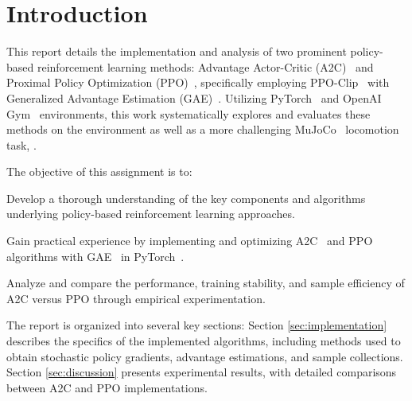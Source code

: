 \section{Introduction}
\label{sec:introduction}

This report details the implementation and analysis of two prominent policy-based reinforcement learning methods: Advantage Actor-Critic (A2C)~\cite{han2020actorcriticreinforcementlearningcontrol} and Proximal Policy Optimization (PPO)~\cite{schulman2017proximal}, specifically employing PPO-Clip~\cite{huang2024ppoclipattainsglobaloptimality} with Generalized Advantage Estimation (GAE)~\cite{schulman2018highdimensionalcontinuouscontrolusing}.
Utilizing PyTorch~\cite{PyTorch2} and OpenAI Gym~\cite{brockman2016openai} environments, this work systematically explores and evaluates these methods on the \pendulum environment as well as a more challenging MuJoCo~\cite{MuJoCo} locomotion task, \walker.

The objective of this assignment is to:

Develop a thorough understanding of the key components and algorithms underlying policy-based reinforcement learning approaches.

Gain practical experience by implementing and optimizing A2C~\cite{han2020actorcriticreinforcementlearningcontrol} and PPO~\cite{schulman2017proximal} algorithms with GAE~\cite{schulman2018highdimensionalcontinuouscontrolusing} in PyTorch~\cite{PyTorch2}.

Analyze and compare the performance, training stability, and sample efficiency of A2C versus PPO through empirical experimentation.

The report is organized into several key sections:
Section \ref{sec:implementation} describes the specifics of the implemented algorithms, including methods used to obtain stochastic policy gradients, advantage estimations, and sample collections.
Section \ref{sec:discussion} presents experimental results, with detailed comparisons between A2C and PPO implementations.
